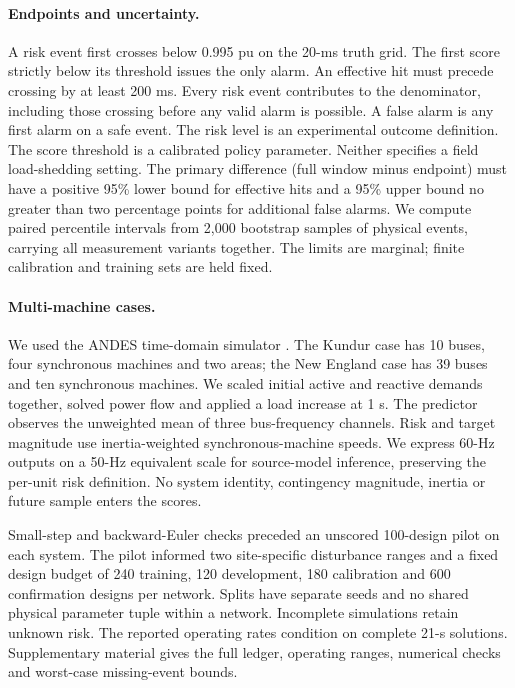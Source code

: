 \documentclass[10pt]{article}
\begin{document}
\paragraph{Endpoints and uncertainty.}
A risk event first crosses below 0.995 pu on the 20-ms truth grid. The first score strictly below its threshold issues the only alarm. An effective hit must precede crossing by at least 200 ms. Every risk event contributes to the denominator, including those crossing before any valid alarm is possible. A false alarm is any first alarm on a safe event. The risk level is an experimental outcome definition. The score threshold is a calibrated policy parameter. Neither specifies a field load-shedding setting. The primary difference (full window minus endpoint) must have a positive 95\% lower bound for effective hits and a 95\% upper bound no greater than two percentage points for additional false alarms. We compute paired percentile intervals from 2,000 bootstrap samples of physical events, carrying all measurement variants together. The limits are marginal; finite calibration and training sets are held fixed.

\paragraph{Multi-machine cases.}
We used the ANDES time-domain simulator \cite{andes}. The Kundur case has 10 buses, four synchronous machines and two areas; the New England case has 39 buses and ten synchronous machines. We scaled initial active and reactive demands together, solved power flow and applied a load increase at 1 s. The predictor observes the unweighted mean of three bus-frequency channels. Risk and target magnitude use inertia-weighted synchronous-machine speeds. We express 60-Hz outputs on a 50-Hz equivalent scale for source-model inference, preserving the per-unit risk definition. No system identity, contingency magnitude, inertia or future sample enters the scores.

Small-step and backward-Euler checks preceded an unscored 100-design pilot on each system. The pilot informed two site-specific disturbance ranges and a fixed design budget of 240 training, 120 development, 180 calibration and 600 confirmation designs per network. Splits have separate seeds and no shared physical parameter tuple within a network. Incomplete simulations retain unknown risk. The reported operating rates condition on complete 21-s solutions. Supplementary material gives the full ledger, operating ranges, numerical checks and worst-case missing-event bounds.
\end{document}
